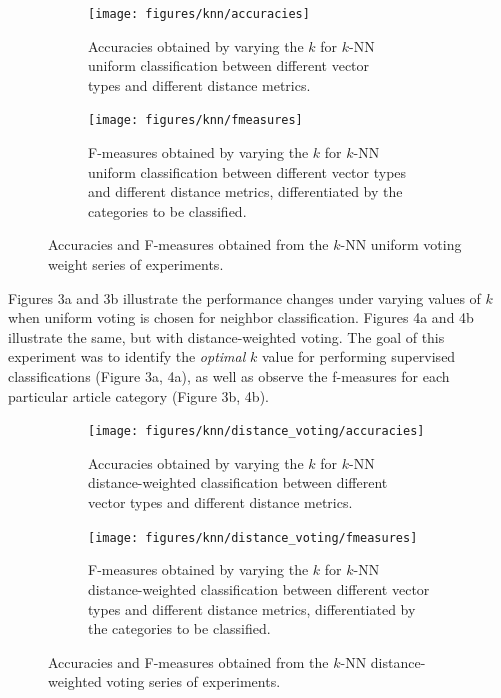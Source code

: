 \documentclass[11pt]{article}
\begin{document}
\begin{figure}[h!] \label{fig:perf_knn}
	\centering
	\begin{subfigure}{.5\textwidth}
	  \centering
	  \texttt{[image: figures/knn/accuracies]}
	  \caption{Accuracies obtained by varying the $k$ for $k$-NN\\
	   uniform classification between different vector \\ types and different distance metrics.}
	  \label{fig:knn_accuracies}
	\end{subfigure}%
	\begin{subfigure}{.5\textwidth}
	  \centering
	  \texttt{[image: figures/knn/fmeasures]}
	  \caption{F-measures obtained by varying the $k$ for $k$-NN\\
	   uniform classification between different vector types and different distance metrics, differentiated by the categories to be classified.}
	  \label{fig:knn_fmeasures}
	\end{subfigure}
	\caption{Accuracies and F-measures obtained from the $k$-NN uniform voting weight series of experiments.}
\end{figure}

Figures 3a and 3b illustrate the performance changes under varying values of $k$ when uniform voting is chosen for neighbor classification.
Figures 4a and 4b illustrate the same, but with distance-weighted voting.
The goal of this experiment was to identify the \emph{optimal} $k$ value for performing supervised classifications (Figure 3a, 4a), as well as observe the f-measures for each particular article category (Figure 3b, 4b).

\begin{figure}[h!] \label{fig:perf_knn_distance}
	\centering
	\begin{subfigure}{.5\textwidth}
	  \centering
	  \texttt{[image: figures/knn/distance\_voting/accuracies]}
	  \caption{Accuracies obtained by varying the $k$ for $k$-NN\\
	   distance-weighted classification between different \\
	   vector types and different distance metrics.}
	  \label{fig:knn_accuracies}
	\end{subfigure}%
	\begin{subfigure}{.5\textwidth}
	  \centering
	  \texttt{[image: figures/knn/distance\_voting/fmeasures]}
	  \caption{F-measures obtained by varying the $k$ for $k$-NN\\
	   distance-weighted classification between different vector types and different distance metrics, differentiated by the categories to be classified.}
	  \label{fig:knn_fmeasures}
	\end{subfigure}
	\caption{Accuracies and F-measures obtained from the $k$-NN distance-weighted voting series of experiments.}
\end{figure}
\end{document}

